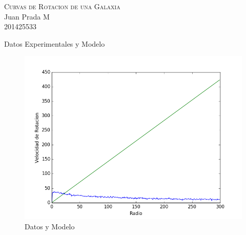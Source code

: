 \documentclass[]{article}
\begin{document}
\begin{center}
\textsc{\Huge Curvas de Rotacion de una Galaxia}\\[0.8cm]
\Large Juan Prada M \\[0.5cm]
\Large 201425533 \\[0.5cm]
\end{center}

{Datos Experimentales y Modelo}\\[0.1cm]

\begin{figure}[!ht]
{
    \includegraphics[width=\linewidth]{DatosyModelo.png}
    \caption{Datos y Modelo}
}
\end{figure}
\end{document}
